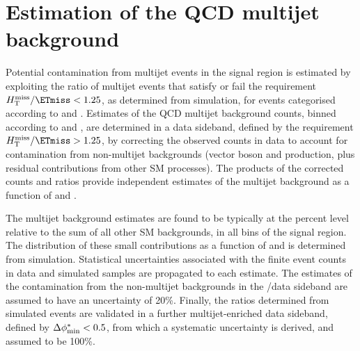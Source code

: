 \section{Estimation of the QCD multijet background}
\label{sec:qcd_background}


Potential contamination from multijet events in the signal region is
estimated by exploiting the ratio of multijet events that satisfy or
fail the requirement $\HTmiss/\ETmiss < 1.25$, as determined from
simulation, for events categorised according to \njet and
\scalht. Estimates of the QCD multijet background counts, binned
according to \njet and \scalht, are determined in a data sideband,
defined by the requirement $\HTmiss/\ETmiss > 1.25$, by correcting the
observed counts in data to account for contamination from non-multijet
backgrounds (vector boson and \ttbar production, plus residual
contributions from other SM processes). The products of the corrected
counts and ratios provide independent estimates of the multijet
background as a function of \njet and \scalht.

The multijet background estimates are found to be typically at the
percent level relative to the sum of all other SM backgrounds, in all
bins of the signal region. The distribution of these small
contributions as a function of \nb and \mht is determined from
simulation. Statistical uncertainties associated with the finite event
counts in data and simulated samples are propagated to each
estimate. The estimates of the contamination from the non-multijet
backgrounds in the \HTmiss/\ETmiss data sideband are assumed to have
an uncertainty of 20\%. Finally, the ratios determined from simulated
events are validated in a further multijet-enriched data sideband,
defined by $\Delta\phi^{*}_{\rm min} < 0.5$, from which a systematic uncertainty is
derived, and assumed to be 100\%.

